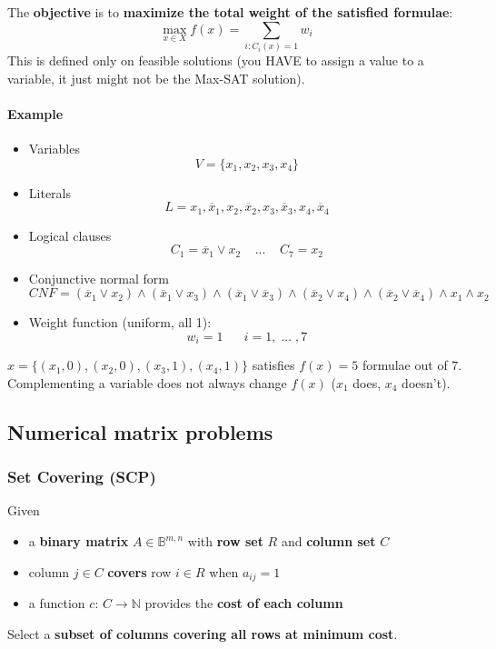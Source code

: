 \documentclass[11pt]{article}
\begin{document}
	The \textbf{objective} is to \textbf{maximize the total weight of the satisfied formulae}: 
	$$ \max_{x \in X} f(x) = \sum_{i:C_i(x) = 1} w_i $$
	This is defined only on feasible solutions (you HAVE to assign a value to a variable, it just might not be the Max-SAT solution).\\
	
	\paragraph{Example}
	\begin{itemize}
		\item Variables
		$$ V = \{x_1, x_2, x_3, x_4\} $$
		\item Literals
		$$ L = {x_1, \overline{x}_1, x_2, \overline{x}_2, x_3, \overline{x}_3, x_4, \overline{x}_4} $$
		\item Logical clauses
		$$ C_1 = \overline{x}_1 \vee x_2 \;\;\;\; ... \;\;\;\; C_7 = x_2 $$ 
		\item Conjunctive normal form
		$$CNF = (\overline{x}_1 \vee x_2) \wedge (\overline{x}_1 \vee x_3) \wedge (\overline{x}_1 \vee \overline{x}_3) \wedge (\overline{x}_2 \vee x_4) \wedge (\overline{x}_2 \vee \overline{x}_4) \wedge x_1 \wedge x_2 $$
		\item Weight function (uniform, all 1):
		$$ w_i = 1 \;\;\;\;\;\; i = 1, \; ... \; ,7 $$
	\end{itemize}
	$x = \{(x_1, 0), (x_2, 0), (x_3, 1), (x_4, 1)\}$ satisfies $f (x) = 5$ formulae out of $7$.\\
	Complementing a variable does not always change $f(x)$ ($x_1$ does, $x_4$ doesn't).\\
	
	\newpage
	
	\subsection{Numerical matrix problems}
	\subsubsection{Set Covering (SCP)}
	Given
	\begin{itemize}
		\item a \textbf{binary matrix} $A \in \mathbb{B}^{m,n}$ with \textbf{row set} $R$ and \textbf{column set} $C$
		\item column $j \in C$ \textbf{covers} row $i \in R$ when $a_{ij} = 1$
		\item a function $c :\, C \rightarrow \mathbb{N}$ provides the \textbf{cost of each column}
	\end{itemize}
	Select a \textbf{subset of columns covering all rows at minimum cost}.\\
	
\end{document}
